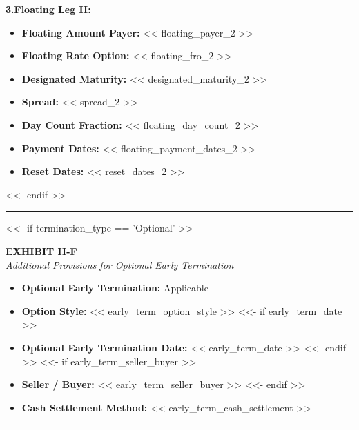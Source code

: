\documentclass[11pt, a4paper]{article}
\begin{document}
\vspace{0.3cm}
\noindent \textbf{3.\quad Floating Leg II:}
\begin{itemize}[leftmargin=2cm, label={}, itemsep=3pt]
    \item \textbf{Floating Amount Payer:} << floating_payer_2 >>
    \item \textbf{Floating Rate Option:} << floating_fro_2 >>
    \item \textbf{Designated Maturity:} << designated_maturity_2 >>
    \item \textbf{Spread:} << spread_2 >>
    \item \textbf{Day Count Fraction:} << floating_day_count_2 >>
    \item \textbf{Payment Dates:} << floating_payment_dates_2 >>
    \item \textbf{Reset Dates:} << reset_dates_2 >>
\end{itemize}

<<- endif >>

\vspace{0.5cm}
\hrule
\vspace{0.5cm}


<<- if termination_type == 'Optional' >>
\begin{center}
    \textbf{EXHIBIT II-F} \\
    \textit{Additional Provisions for Optional Early Termination}
\end{center}

\begin{itemize}[leftmargin=2cm, label={}, itemsep=3pt]
    \item \textbf{Optional Early Termination:} Applicable
    \item \textbf{Option Style:} << early_term_option_style >>
<<- if early_term_date >>
    \item \textbf{Optional Early Termination Date:} << early_term_date >>
<<- endif >>
<<- if early_term_seller_buyer >>
    \item \textbf{Seller / Buyer:} << early_term_seller_buyer >>
<<- endif >>
    \item \textbf{Cash Settlement Method:} << early_term_cash_settlement >>
\end{itemize}

\vspace{0.5cm}
\hrule
\vspace{0.5cm}
\end{document}
